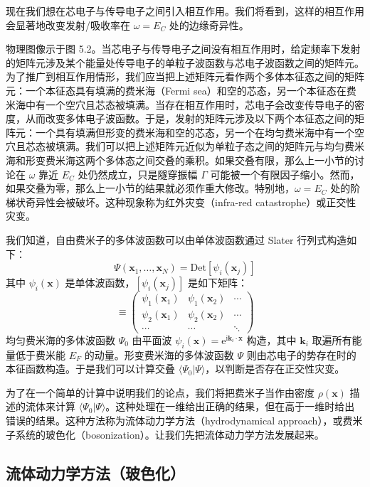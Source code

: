 现在我们想在芯电子与传导电子之间引入相互作用。我们将看到，这样的相互作用会显著地改变发射/吸收率在 $\omega=E_C$ 处的边缘奇异性。

物理图像示于图 5.2。当芯电子与传导电子之间没有相互作用时，给定频率下发射的矩阵元涉及某个能量处传导电子的单粒子波函数与芯电子波函数之间的矩阵元。为了推广到相互作用情形，我们应当把上述矩阵元看作两个多体本征态之间的矩阵元：一个本征态具有填满的费米海（Fermi sea）和空的芯态，另一个本征态在费米海中有一个空穴且芯态被填满。当存在相互作用时，芯电子会改变传导电子的密度，从而改变多体电子波函数。于是，发射的矩阵元涉及以下两个本征态之间的矩阵元：一个具有填满但形变的费米海和空的芯态，另一个在均匀费米海中有一个空穴且芯态被填满。我们可以把上述矩阵元近似为单粒子态之间的矩阵元与均匀费米海和形变费米海这两个多体态之间交叠的乘积。如果交叠有限，那么上一小节的讨论在 $\omega$ 靠近 $E_C$ 处仍然成立，只是隧穿振幅 $\Gamma$ 可能被一个有限因子缩小。然而，如果交叠为零，那么上一小节的结果就必须作重大修改。特别地，$\omega=E_C$ 处的阶梯状奇异性会被破坏。这种现象称为红外灾变（infra-red catastrophe）或正交性灾变。

我们知道，自由费米子的多体波函数可以由单体波函数通过 Slater 行列式构造如下：
\begin{equation*}
\Psi(\pmb{x}_1,\ldots,\pmb{x}_N)=\mathrm{Det}[\psi_i(\pmb{x}_j)]
\end{equation*}
其中 $\psi_i(\pmb{x})$ 是单体波函数，$[\psi_i(\pmb{x}_j)]$ 是如下矩阵：
\begin{equation*}
[\psi_i(\pmb{x}_j)]\equiv
\begin{pmatrix}
\psi_1(\pmb{x}_1) & \psi_1(\pmb{x}_2) & \cdots\\
\psi_2(\pmb{x}_1) & \psi_2(\pmb{x}_2) & \cdots\\
\cdots & \cdots & \ddots
\end{pmatrix}
\end{equation*}
均匀费米海的多体波函数 $\Psi_0$ 由平面波 $\psi_i(\pmb{x})=\mathrm{e}^{\mathrm{i}\pmb{k}_i\cdot\pmb{x}}$ 构造，其中 $\pmb{k}_i$ 取遍所有能量低于费米能 $E_F$ 的动量。形变费米海的多体波函数 $\Psi$ 则由芯电子的势存在时的本征函数构造。于是我们可以计算交叠 $\langle\Psi_0|\Psi\rangle$，以判断是否存在正交性灾变。

为了在一个简单的计算中说明我们的论点，我们将把费米子当作由密度 $\rho(\pmb{x})$ 描述的流体来计算 $\langle\Psi_0|\Psi\rangle$。这种处理在一维给出正确的结果，但在高于一维时给出错误的结果。这种方法称为流体动力学方法（hydrodynamical approach），或费米子系统的玻色化（bosonization）。让我们先把流体动力学方法发展起来。

\subsection{流体动力学方法（玻色化）}


